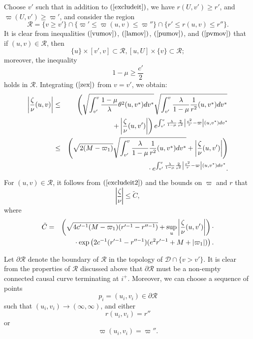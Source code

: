 \documentclass{article}
\newcommand{\zn}{\frac{\zeta}{\nu}}
\begin{document}
Choose $v'$ such that in addition to $(\ref{excludeit})$, we have
$r(U,v')\ge r'$, and $\varpi(U,v')\ge \varpi'$,
and consider the region 
\[
\mathcal{R}=\{v\ge v'\}\cap\{\varpi'\le\varpi(u,v)\le \varpi''\}
\cap\{r'\le r(u,v)\le r''\}.
\]
It is clear from inequalities $(\ref{vumov})$, $(\ref{lamov})$, 
$(\ref{pumov})$, and $(\ref{pvmov})$
that if $(u,v)\in\mathcal{R}$, then 
\[
\{u\}\times[v',v]\subset\mathcal{R}, [u,U]\times \{v\}\subset\mathcal{R};
\]
moreover, the inequality
\begin{equation}
\label{excludeit2}
1-\mu\ge\frac{c'}2
\end{equation}
holds in $\mathcal{R}$.
Integrating $(\ref{zex})$
from $v=v'$, we obtain:
\begin{eqnarray*}
\left|\zn(u,v)\right|	&\le&	\left(\sqrt{\int_{v'}^v{\frac{1-\mu}\lambda\theta^2
							(u,v^*)dv^*}}
							\sqrt{\int_{v'}^v
							{\frac{\lambda}{1-\mu}
							\frac1{r^2}(u,v^*)dv^*}}\right.\\
				&   & \hbox{\ \ }\left.+\left|\zn(u,v')\right|\right)
							e^{\int_{v'}^v{
							\frac\lambda{1-\mu}
							\frac2{r^2}\left|
							\frac{e^2}r-\varpi\right|
							(u,v^*)dv^*}}\\
				&\le&	\left(\sqrt{2(M-\varpi_1)}
							\sqrt{\int_{v'}^v{\frac{\lambda}
							{1-\mu}
							\frac1{r^2}(u,v^*)dv^*}}
							+\left|\zn(u,v')\right|
							\right)\\
				&   &\hbox{\ \ }\cdot e^{\int_{v'}^v{\frac\lambda{1-\mu}
							\frac2{r^2}\left|
							\frac{e^2}r-\varpi\right|
							(u,v^*)dv^*}}.
\end{eqnarray*}
For $(u,v)\in\mathcal{R}$, it follows 
from $(\ref{excludeit2})$ and the bounds on $\varpi$ and $r$ that
\begin{equation}
\label{stobfR}
\left|\zn\right|\le\tilde{C},
\end{equation}
where
\begin{eqnarray*}
\tilde{C}&=&\left(\sqrt{4c'^{-1}(M-\varpi_1)(r'^{-1}-r''^{-1})}+\sup_u\left|\zn(u,v')\right|\right)\cdot\\
	&&\hbox{\ \ }\cdot
		\exp\left(2c^{-1}(r'^{-1}-r''^{-1})(e^2r'^{-1}+M+|\varpi_1|)\right).
\end{eqnarray*}

Let $\partial\mathcal{R}$ denote the boundary of $\mathcal{R}$ in the topology of
$\mathcal{D}\cap\{v>v'\}$.
It is clear from the properties of $\mathcal{R}$ discussed above
that $\partial\mathcal{R}$ must be a non-empty connected causal curve
terminating 
at $i^+$.
Moreover, we can choose a sequence of points 
\[
p_i=(u_i,v_i)\in\partial\mathcal{R}
\]
such that $(u_i,v_i)\to(\infty,\infty)$,
and 
either
\begin{equation}
\label{3ava1}
r(u_i,v_i)=r''
\end{equation}
or
\begin{equation}
\label{3ava2}
\varpi(u_i,v_i)=\varpi''.
\end{equation}
\end{document}
